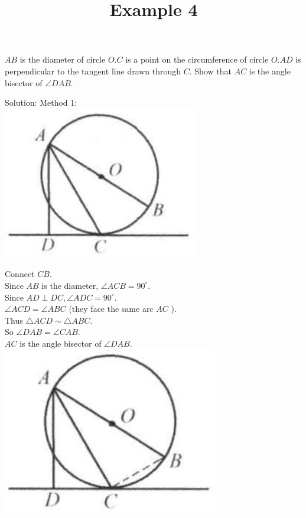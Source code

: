 \documentclass{article}
\title{Example 4}
\date{}
\begin{document}
\maketitle

\(A B\) is the diameter of circle \(O . C\) is a point on the circumference of circle \(O . A D\) is perpendicular to the tangent line drawn through \(C\). Show that \(A C\) is the angle bisector of \(\angle D A B\).

Solution:
Method 1:\\
\centering
\includegraphics[width=\textwidth]{images/164(1).jpg}

Connect \(C B\).\\
Since \(A B\) is the diameter, \(\angle A C B=90^{\circ}\).\\
Since \(A D \perp D C, \angle A D C=90^{\circ}\).\\
\(\angle A C D=\angle A B C\) (they face the same arc \(A C\) ).\\
Thus \(\triangle A C D \sim \triangle A B C\).\\
So \(\angle D A B=\angle C A B\).\\
\(A C\) is the angle bisector of \(\angle D A B\).\\
\centering
\includegraphics[width=\textwidth]{images/164(2).jpg}
\end{document}
